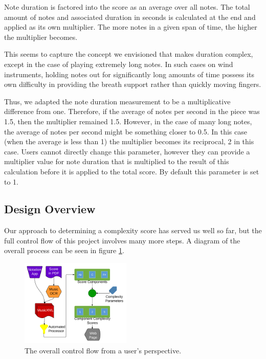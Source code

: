 \documentclass[10pt,preprint]{sigplanconf}
\begin{document}
{Note duration is factored into the score as an average over all notes. The total amount of notes and associated duration in seconds is calculated at the end and applied as its own multiplier. The more notes in a given span of time, the higher the multiplier becomes.

This seems to capture the concept we envisioned that makes duration complex, except in the case of playing extremely long notes. In such cases on wind instruments, holding notes out for significantly long amounts of time possess its own difficulty in providing the breath support rather than quickly moving fingers.

Thus, we adapted the note duration measurement to be a multiplicative difference from one. Therefore, if the average of notes per second in the piece was 1.5, then the multiplier remained 1.5. However, in the case of many long notes, the average of notes per second might be something closer to 0.5. In this case (when the average is less than 1) the multiplier becomes its reciprocal, 2 in this case. Users cannot directly change this parameter, however they can provide a multiplier value for note duration that is multiplied to the result of this calculation before it is applied to the total score. By default this parameter is set to 1.

\subsection{Design Overview} 
\label{sec:design}

Our approach to determining a complexity score has served us well so far, but the full control flow of this project involves many more steps. A diagram of the overall process can be seen in figure \ref{image:flow}.

\begin{figure}[ht!]
	\centering
		\includegraphics[width=0.47\textwidth]{JoinedCropped.png}
		\caption{The overall control flow from a user's perspective.}
		\label{image:flow}
\end{figure}

}
\end{document}
